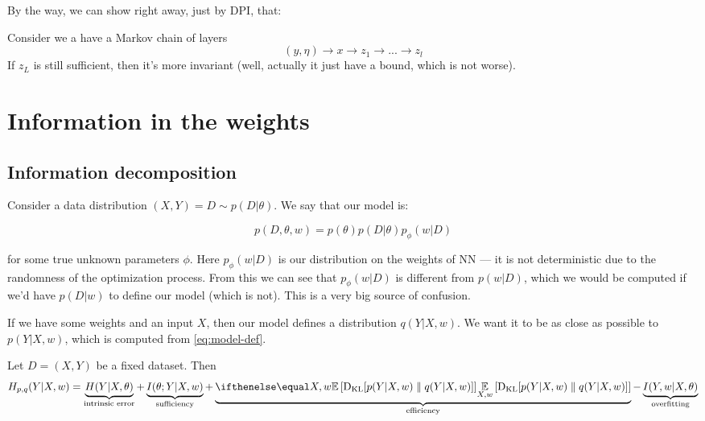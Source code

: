 \documentclass{article}
\begin{document}
By the way, we can show right away, just by DPI, that:
\begin{corollary}
Consider we a have a Markov chain of layers
\[
(y,\eta) \to x \to z_1 \to ... \to z_l
\]
If $z_L$ is still sufficient, then it's more invariant (well, actually it just have a bound, which is not worse).
\end{corollary}


\section{Information in the weights}
\subsection*{Information decomposition}
Consider a data distribution $(X,Y) = D \sim p(D|\theta)$.
We say that our model is:

\begin{equation}\label{eq:model-def}
p(D, \theta, w) = p(\theta) p(D|\theta) p_\phi(w| D)
\end{equation}

for some true unknown parameters $\phi$.
Here $p_\phi(w|D)$ is our distribution on the weights of NN --- it is not deterministic due to the randomness of the optimization process.
From this we can see that $p_\phi(w|D)$ is different from $p(w|D)$, which we would be computed if we'd have $p(D|w)$ to define our model (which is not).
This is a very big source of confusion.

If we have some weights and an input $X$, then our model defines a distribution $q(Y|X,w)$.
We want it to be as close as possible to $p(Y|X,w)$, which is computed from \eqref{eq:model-def}.

\begin{theorem}
Let $D = (X,Y)$ be a fixed dataset.
Then
\begin{equation}
H_{p,q}(Y|X,w) = \underbrace{H(Y|X,\theta)}_{\text{intrinsic error}} + \underbrace{I(\theta; Y | X,w)}_{\text{sufficiency}} + \underbrace{\expect[X,w]{\kl{p(Y|X,w)}{q(Y|X,w)}}}_{\text{efficiency}} - \underbrace{I(Y,w|X,\theta)}_{\text{overfitting}}
\end{equation}
\end{theorem}
\end{document}
